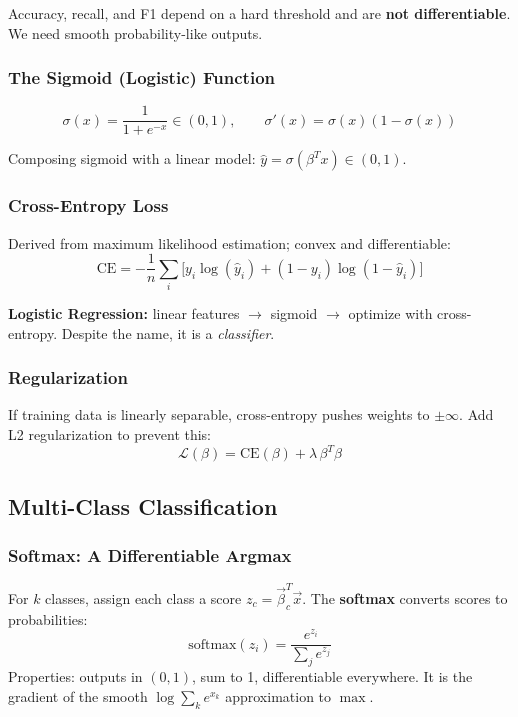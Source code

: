 \documentclass[11pt]{article}
\begin{document}
Accuracy, recall, and F1 depend on a hard threshold and are \textbf{not differentiable}. We need smooth probability-like outputs.

\subsubsection{The Sigmoid (Logistic) Function}

\[
\sigma(x) = \frac{1}{1+e^{-x}} \in (0,1), \qquad \sigma'(x) = \sigma(x)(1-\sigma(x))
\]

Composing sigmoid with a linear model: $\hat{y} = \sigma(\beta^T x) \in (0,1)$.

\subsubsection{Cross-Entropy Loss}

Derived from maximum likelihood estimation; convex and differentiable:
\[
\boxed{\text{CE} = -\frac{1}{n}\sum_i\bigl[y_i\log(\hat{y}_i) + (1-y_i)\log(1-\hat{y}_i)\bigr]}
\]

\begin{takeawaybox}
\textbf{Logistic Regression:} linear features $\to$ sigmoid $\to$ optimize with cross-entropy. Despite the name, it is a \emph{classifier}.
\end{takeawaybox}

\subsubsection{Regularization}

If training data is linearly separable, cross-entropy pushes weights to $\pm\infty$. Add L2 regularization to prevent this:
\[
\mathcal{L}(\beta) = \text{CE}(\beta) + \lambda\,\beta^T\beta
\]

\subsection{Multi-Class Classification}

\subsubsection{Softmax: A Differentiable Argmax}

For $k$ classes, assign each class a score $z_c = \vec{\beta}_c^T\vec{x}$. The \textbf{softmax} converts scores to probabilities:
\[
\text{softmax}(z_i) = \frac{e^{z_i}}{\sum_j e^{z_j}}
\]
Properties: outputs in $(0,1)$, sum to 1, differentiable everywhere. It is the gradient of the smooth $\log\sum_k e^{x_k}$ approximation to $\max$.
\end{document}
